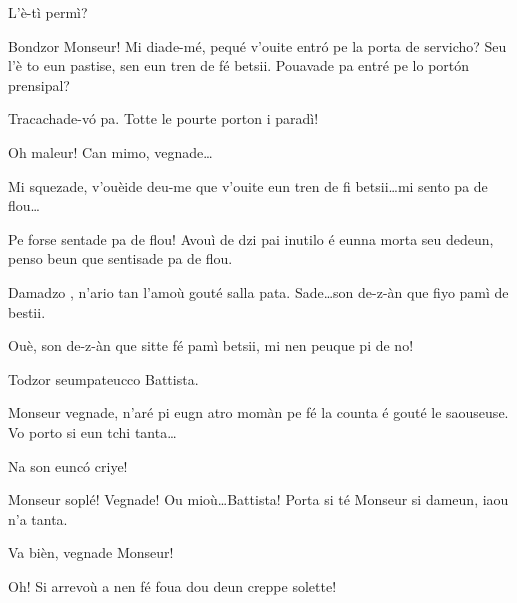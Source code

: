 \begin{drama}
\newpage
{}


\Preyespeaks L’è-tì permì? 

\Cesarspeaks  Bondzor Monseur! Mi diade-mé, pequé v'ouite entr\'o pe la porta de servicho? Seu l'è to eun pastise, sen eun tren de fé betsii. Pouavade pa entré pe lo port\'on prensipal?

\Preyespeaks Tracachade-v\'o pa. Totte le pourte porton i paradì!

\Cesarspeaks{} Oh maleur! Can mimo, vegnade\ldots

\Preyespeaks{} Mi squezade, v'ouèide deu-me que v'ouite eun tren de fi betsii\ldots mi sento pa de flou\ldots

\Hermannspeaks{} Pe forse sentade pa de flou! Avouì de dzi pai i\-nutilo é eunna morta seu dedeun, penso beun que sentisade pa de flou.

\Preyespeaks Damadzo \tristee, n’ario tan l'amoù gouté salla pata. Sade\ldots son de-z-àn que fiyo pamì de bestii.

\Battistaspeaks  Ouè, son de-z-àn que sitte fé pamì betsii, mi nen peuque pi de no! 


\Preyespeaks{} Todzor seumpateucco Battista.

\Cesarspeaks  Monseur vegnade, n’aré pi eugn atro momàn pe fé la counta é gouté le saouseuse. Vo porto si eun tchi tanta\ldots


\Preyespeaks Na son eunc\'o criye!

\Cesarspeaks Monseur soplé! Vegnade! Ou mioù\ldots Battista! Porta si té Monseur si dameun, iaou n'a tanta.

\Battistaspeaks Va bièn, vegnade Monseur!

\Cesarspeaks Oh! Si arrevoù a nen fé foua dou deun creppe solette!


\ridocliou

\scene[-- La mii? ]



\end{drama}
